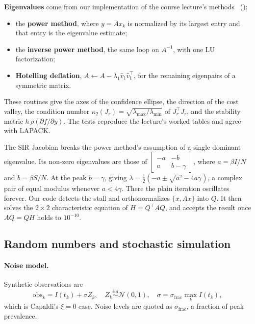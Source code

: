 \documentclass[sigconf]{acmart}
\begin{document}
\textbf{Eigenvalues} come from our implementation of the course
lecture's methods~\cite{lecture_eigen} ():
\begin{itemize}
  \item the \textbf{power method}, where $y=Ax_k$ is normalized by its
    largest entry and that entry is the eigenvalue estimate;
  \item the \textbf{inverse power method}, the same loop on $A^{-1}$,
    with one LU factorization;
  \item \textbf{Hotelling deflation},
    $A\leftarrow A-\lambda_1\hat v_1\hat v_1^\top$, for the remaining
    eigenpairs of a symmetric matrix.
\end{itemize}
These routines give the axes of the confidence ellipse, the direction of
the cost valley, the condition number
$\kappa_2(J_r)=\sqrt{\lambda_{\max}/\lambda_{\min}}$ of $J_r^\top J_r$,
and the stability metric $h\,\rho(\partial f/\partial y)$. The tests
reproduce the lecture's worked tables and agree with LAPACK.

The SIR Jacobian breaks the power method's assumption of a single
dominant eigenvalue. Its non-zero eigenvalues are those of
$\left[\begin{smallmatrix}-a&-b\\a&b-\gamma\end{smallmatrix}\right]$,
where $a=\beta I/N$ and $b=\beta S/N$. At the peak $b=\gamma$, giving
$\lambda=\tfrac12(-a\pm\sqrt{a^2-4a\gamma})$, a complex pair of equal
modulus whenever $a<4\gamma$. There the plain iteration oscillates
forever. Our code detects the stall and orthonormalizes $\{x,Ax\}$ into
$Q$. It then solves the $2\times2$ characteristic equation of
$H=Q^\top AQ$, and accepts the result once $AQ=QH$ holds to $10^{-10}$.

\subsection{Random numbers and stochastic simulation}
\label{sec:stoch}
\paragraph{Noise model.} Synthetic observations are
\begin{equation}
  \mathrm{obs}_k=I(t_k)+\sigma Z_k,\quad Z_k\overset{iid}{\sim}\mathcal
  N(0,1),\quad \sigma=\sigma_{\mathrm{frac}}\max_k I(t_k),
  \label{eq:noise}
\end{equation}
which is Capaldi's $\xi=0$ case. Noise levels are quoted as
$\sigma_{\mathrm{frac}}$, a fraction of peak prevalence.
\end{document}
